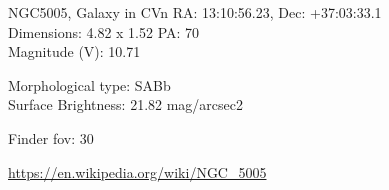 \begin{block}{NGC5005, Galaxy in CVn}
    RA: 13:10:56.23, Dec: +37:03:33.1 \\ 
    Dimensions: 4.82 x 1.52 PA: 70 \\ 
    Magnitude (V): 10.71

    Morphological type: SABb \\ 
    Surface Brightness: 21.82 mag/arcsec2 


    Finder fov: 30 

    \url{https://en.wikipedia.org/wiki/NGC_5005} 
\end{block}